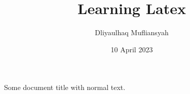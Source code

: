 \documentclass[a4paper, 12pt]{article}
\begin{document}
\author{Dliyaulhaq Mufliansyah}
\title{Learning Latex}
\date{10 April 2023}
\maketitle

Some document title with normal text.
\end{document}
